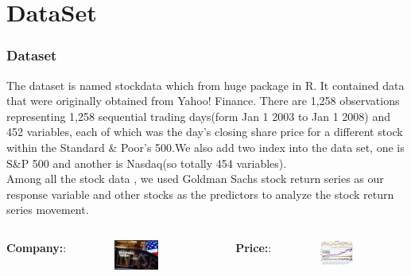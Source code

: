 \documentclass{beamer}
\begin{document}
\section{DataSet}
\begin{frame}
\frametitle{Dataset}
The dataset is named stockdata which from huge package in R. It contained data that were
originally obtained from Yahoo! Finance. There are 1,258
observations representing 1,258 sequential trading days(form Jan 1 2003 to Jan 1 2008) and 452
variables, each of which was the day's closing share price for a different
stock within the Standard \& Poor's 500.We also add two index into the data set, one is S\&P 500 and another is Nasdaq(so totally 454 variables).\\
Among all the stock data , we used Goldman Sachs stock return
series as our response variable and other stocks as the predictors to analyze the stock return series movement.
\begin{columns}
\column{2.3in}
\textbf{Company:}:
 \begin{figure}
     \includegraphics[width=0.6\textwidth, height=0.25\textheight]{gschart.jpg}
\end{figure}

\column{2.3in}

\textbf{Price:}:
\begin{figure}
     \includegraphics[width=0.6\textwidth, height=0.3\textheight]{gs_plot.jpg}
\end{figure}

\end{columns}
\end{frame}
\end{document}

